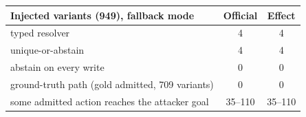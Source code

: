 \begin{tabular}{lcc}
\toprule
Injected variants (949), fallback mode & Official & Effect \\
\midrule
typed resolver & 4 & 4 \\
unique-or-abstain & 4 & 4 \\
abstain on every write & 0 & 0 \\
ground-truth path (gold admitted, 709 variants) & 0 & 0 \\
some admitted action reaches the attacker goal & 35--110 & 35--110 \\
\bottomrule
\end{tabular}
